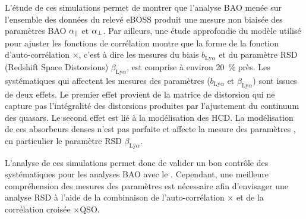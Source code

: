\begin{mdframed}[linecolor=Prune,linewidth=1]
\begin{small}
\begin{multicols}{2}
  L'étude de ces simulations permet de montrer que l'analyse BAO menée sur l'ensemble des données \lya{} du relevé eBOSS produit une mesure non biaisée des paramètres BAO $\alpha_{\parallel}{}$ et $\alpha_{\perp}{}$.
  Par ailleurs, une étude approfondie du modèle utilisé pour ajuster les fonctions de corrélation montre que la forme de la fonction d'auto-corrélation \lya{}$\times$\lya{}, c'est à dire les mesures du biais $b_{\mathrm{Ly}\alpha}$ et du paramètre RSD (Redshift Space Distorsions) $\beta_{\mathrm{Ly}\alpha}$, est comprise à environ \SI{20}{\percent} près.
  Les systématiques qui affectent les mesures des paramètres \lya{} ($b_{\mathrm{Ly}\alpha}$ et $\beta_{\mathrm{Ly}\alpha}$) sont issues de deux effets.
  Le premier effet provient de la matrice de distorsion qui ne capture pas l'intégralité des distorsions produites par l'ajustement du continuum des quasars.
  Le second effet est lié à la modélisation des HCD.
  La modélisation de ces absorbeurs denses n'est pas parfaite et affecte la mesure des paramètres \lya{}, en particulier le paramètre RSD $\beta_{\mathrm{Ly}\alpha}$.

  L'analyse de ces simulations permet donc de valider un bon contrôle des systématiques pour les analyses BAO avec le \lya{}.
  Cependant, une meilleure compréhension des mesures des paramètres \lya{} est nécessaire afin d'envisager une analyse RSD à l'aide de la combinaison de l'auto-corrélation \lya{}$\times$\lya{} et de la corrélation croisée \lya{}$\times$QSO.
\end{multicols}
\end{small}
\end{mdframed}

